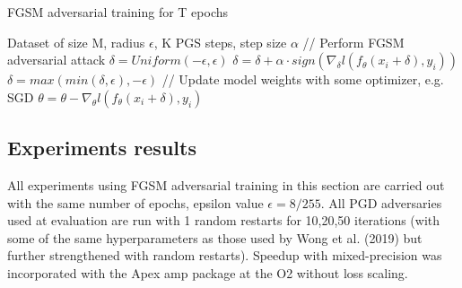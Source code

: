 \documentclass{article}
\begin{document}
\begin{algorithm}[H]
	\caption{FGSM adversarial training for T epochs}
	\begin{algorithmic}[1]
		\Require Dataset of size M, radius $\epsilon$, K PGS steps, step size $\alpha$
		\State // Perform FGSM adversarial attack
		\State $\delta = Uniform(-\epsilon, \epsilon)$
		\State $\delta = \delta + \alpha \cdot sign(\nabla_{\delta} l(f_{\theta}(x_i + \delta), y_i))$
		\State $\delta = max(min(\delta, \epsilon), -\epsilon)$
		\State // Update model weights with some optimizer, e.g. SGD
		\State $\theta = \theta - \nabla_{\theta} l(f_{\theta}(x_i + \delta), y_i)$
		\EndFor
		\EndFor
	\end{algorithmic}
\end{algorithm}

\subsection{Experiments results}

All experiments using FGSM adversarial training in this section are carried out with the same number of epochs, epsilon value $\epsilon = 8/255$. All PGD adversaries used at
evaluation are run with 1 random restarts for 10,20,50 iterations (with some of the same hyperparameters as those
used by Wong et al. (2019) but further strengthened with random restarts). Speedup with mixed-precision was incorporated with the Apex amp package at the O2 without loss scaling.
\end{document}

